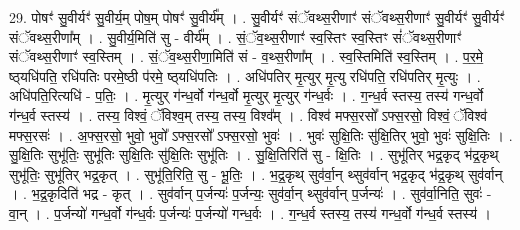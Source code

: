 \documentclass[17pt]{extarticle}
\begin{document}
29. पोषꣳ॑ सु॒वीर्यꣳ॑ सु॒वीर्य॒म् पोष॒म् पोषꣳ॑ सु॒वीर्य᳚म् । . सु॒वीर्यꣳ॑ संॅवथ्स॒रीणाꣳ॑ संॅवथ्स॒रीणाꣳ॑ सु॒वीर्यꣳ॑ सु॒वीर्यꣳ॑ संॅवथ्स॒रीणा᳚म् । . सु॒वीर्य॒मिति॑ सु - वीर्य᳚म् । . सं॒ॅव॒थ्स॒रीणाꣳ॑ स्व॒स्तिꣳ स्व॒स्तिꣳ सं॑ॅवथ्स॒रीणाꣳ॑ संॅवथ्स॒रीणाꣳ॑ स्व॒स्तिम् । . सं॒ॅव॒थ्स॒रीणा॒मिति॑ सं - व॒थ्स॒रीणा᳚म् । . स्व॒स्तिमिति॑ स्व॒स्तिम् । . प॒र॒मे॒ ष्ठ्‌यधि॑पति॒ रधि॑पतिः परमे॒ष्ठी प॑रमे॒ ष्ठ्‌यधि॑पतिः । . अधि॑पतिर् मृ॒त्युर् मृ॒त्यु रधि॑पति॒ रधि॑पतिर् मृ॒त्युः । . अधि॑पति॒रित्यधि॑ - प॒तिः॒ । . मृ॒त्युर् ग॑न्ध॒र्वो ग॑न्ध॒र्वो मृ॒त्युर् मृ॒त्युर् ग॑न्ध॒र्वः । . ग॒न्ध॒र्व स्तस्य॒ तस्य॑ गन्ध॒र्वो ग॑न्ध॒र्व स्तस्य॑ । . तस्य॒ विश्वं॒ ॅविश्व॒म् तस्य॒ तस्य॒ विश्व᳚म् । . विश्व॑ मफ्स॒रसो᳚ ऽफ्स॒रसो॒ विश्वं॒ ॅविश्व॑ मफ्स॒रसः॑ । . अ॒फ्स॒रसो॒ भुवो॒ भुवो᳚ ऽफ्स॒रसो᳚ ऽफ्स॒रसो॒ भुवः॑ । . भुवः॑ सुक्षि॒तिः सु॑क्षि॒तिर् भुवो॒ भुवः॑ सुक्षि॒तिः । . सु॒क्षि॒तिः सुभू॑तिः॒ सुभू॑तिः सुक्षि॒तिः सु॑क्षि॒तिः सुभू॑तिः । . सु॒क्षि॒तिरिति॑ सु - क्षि॒तिः । . सुभू॑तिर् भद्र॒कृद् भ॑द्र॒कृथ् सुभू॑तिः॒ सुभू॑तिर् भद्र॒कृत् । . सुभू॑ति॒रिति॒ सु - भू॒तिः॒ । . भ॒द्र॒कृथ् सुव॑र्वा॒न् थ्सुव॑र्वान् भद्र॒कृद् भ॑द्र॒कृथ् सुव॑र्वान् । . भ॒द्र॒कृदिति॑ भद्र - कृत् । . सुव॑र्वान् प॒र्जन्यः॑ प॒र्जन्यः॒ सुव॑र्वा॒न् थ्सुव॑र्वान् प॒र्जन्यः॑ । . सुव॑र्वा॒निति॒ सुवः॑ - वा॒न् । . प॒र्जन्यो॑ गन्ध॒र्वो ग॑न्ध॒र्वः प॒र्जन्यः॑ प॒र्जन्यो॑ गन्ध॒र्वः । . ग॒न्ध॒र्व स्तस्य॒ तस्य॑ गन्ध॒र्वो ग॑न्ध॒र्व स्तस्य॑ । \newline
\end{document}
